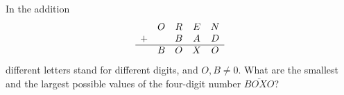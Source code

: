 In the addition
\[\begin{array}{ccccc}&O&R&E&N\\+&&B&A&D\\\hline&B&O&X&O\end{array}\]
different letters stand for different digits, and $O,B\ne0$. What are the smallest and the largest possible values of the four-digit number $\overline{BOXO}$?
